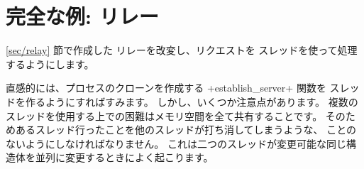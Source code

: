 \section{\label{ex/th-relais}完全な例: {\normalfont\http} リレー}

\ref{sec/relay} 節で作成した \http リレーを改変し、リクエストを
スレッドを使って処理するようにします。

直感的には、プロセスのクローンを作成する \ml+establish_server+ 関数を
スレッドを作るようにすればすみます。
しかし、いくつか注意点があります。
複数のスレッドを使用する上での困難はメモリ空間を全て共有することです。
そのためあるスレッド行ったことを他のスレッドが打ち消してしまうような、
 ことのないようにしなければなりません。
これは二つのスレッドが変更可能な同じ構造体を並列に変更するときによく起こります。

